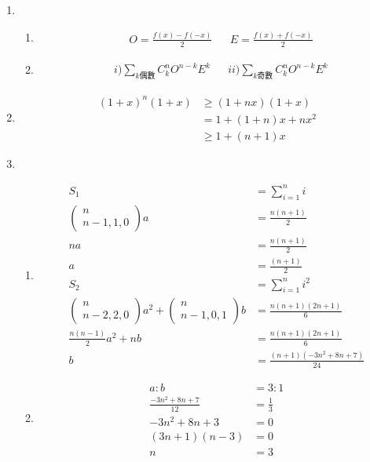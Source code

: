 \documentclass[12pt]{article}
\begin{document}
    \begin{enumerate}
        \item \begin{enumerate}
            \item \begin{align*}
                &O=\frac{f(x)-f(-x)}{2}&&E=\frac{f(x)+f(-x)}{2}
            \end{align*}
            \item \begin{align*}
                &i) \sum_{k\textrm{偶數}}C_k^n O^{n-k}E^k&&ii) \sum_{k\textrm{奇數}}C_k^n O^{n-k}E^k
            \end{align*}
        \end{enumerate}
        \item \begin{align*}
            (1+x)^n(1+x)&\geq (1+nx)(1+x)\\
            &=1+(1+n)x+nx^2\\
            &\geq 1+(n+1)x
        \end{align*}
        \item \begin{enumerate}
            \item \begin{align*}
                S_1&=\sum_{i=1}^{n}i\\
                \begin{pmatrix}
                    n\\n-1,1,0
                \end{pmatrix}a&=\frac{n(n+1)}{2}\\
                na&=\frac{n(n+1)}{2}\\
                a&=\frac{(n+1)}{2}\\
                S_2&=\sum_{i=1}^{n}i^2\\
                \begin{pmatrix}
                    n\\n-2,2,0
                \end{pmatrix}a^2+\begin{pmatrix}
                    n\\n-1,0,1
                \end{pmatrix}b&=\frac{n(n+1)(2n+1)}{6}\\
                \frac{n(n-1)}{2}a^2+nb&=\frac{n(n+1)(2n+1)}{6}\\
                b&=\frac{(n+1)(-3n^2+8n+7)}{24}
            \end{align*}
            \item \begin{align*}
                a:b&=3:1\\
                \frac{-3n^2+8n+7}{12}&=\frac{1}{3}\\
                -3n^2+8n+3&=0\\
                (3n+1)(n-3)&=0\\
                n&=3
            \end{align*}
        \end{enumerate}
    \end{enumerate}
\end{document}
